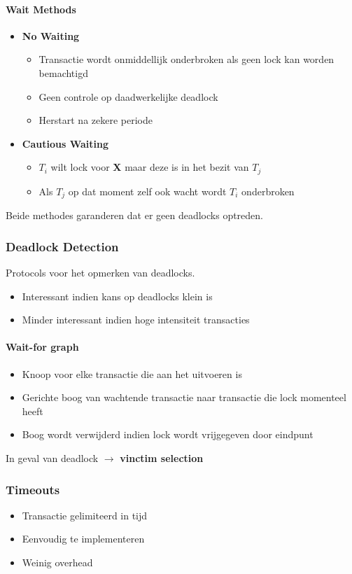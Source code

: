 \paragraph{Wait Methods}
\begin{itemize}
	\item \textbf{No Waiting}
	\begin{itemize}
		\item Transactie wordt onmiddellijk onderbroken als geen lock kan worden bemachtigd
		\item Geen controle op daadwerkelijke deadlock
		\item Herstart na zekere periode
	\end{itemize}
	\item \textbf{Cautious Waiting}
	\begin{itemize}
		\item $T_i$ wilt lock voor \textbf{X} maar deze is in het bezit van $T_j$
		\item Als $T_j$ op dat moment zelf ook wacht wordt $T_i$ onderbroken
	\end{itemize}	
\end{itemize}
Beide methodes garanderen dat er geen deadlocks optreden.

\subsubsection{Deadlock Detection}
Protocols voor het opmerken van deadlocks.
\begin{itemize}
	\item Interessant indien kans op deadlocks klein is
	\item Minder interessant indien hoge intensiteit transacties
\end{itemize}
\paragraph{Wait-for graph}
\begin{itemize}
	\item Knoop voor elke transactie die aan het uitvoeren is
	\item Gerichte boog van wachtende transactie naar transactie die lock momenteel heeft
	\item Boog wordt verwijderd indien lock wordt vrijgegeven door eindpunt
\end{itemize}
In geval van deadlock $\rightarrow$ \textbf{vinctim selection}

\subsubsection{Timeouts} 
\begin{itemize}
	\item Transactie gelimiteerd in tijd
	\item Eenvoudig te implementeren
	\item Weinig overhead
\end{itemize}

